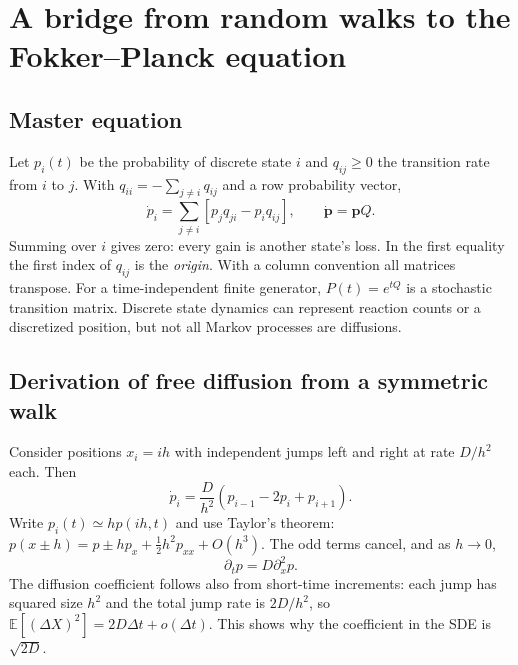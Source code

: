 \documentclass[11pt,a4paper]{article}
\newcommand{\E}{\mathbb E}
\theoremstyle{remark}\newtheorem*{remark}{Physical interpretation}
\begin{document}
\section{A bridge from random walks to the Fokker--Planck equation}
\subsection{Master equation}
Let $p_i(t)$ be the probability of discrete state $i$ and $q_{ij}\geq0$ the transition rate from $i$ to $j$. With $q_{ii}=-\sum_{j\ne i}q_{ij}$ and a row probability vector,
\begin{equation}\dot p_i=\sum_{j\ne i}[p_jq_{ji}-p_iq_{ij}],\qquad \dot{\mathbf p}=\mathbf p Q.\end{equation}
Summing over $i$ gives zero: every gain is another state's loss. In the first equality the first index of $q_{ij}$ is the \emph{origin}. With a column convention all matrices transpose. For a time-independent finite generator, $P(t)=e^{tQ}$ is a stochastic transition matrix. Discrete state dynamics can represent reaction counts or a discretized position, but not all Markov processes are diffusions.

\subsection{Derivation of free diffusion from a symmetric walk}
Consider positions $x_i=ih$ with independent jumps left and right at rate $D/h^2$ each. Then
\begin{equation}\dot p_i=\frac{D}{h^2}(p_{i-1}-2p_i+p_{i+1}).\end{equation}
Write $p_i(t)\simeq h p(ih,t)$ and use Taylor's theorem:
$p(x\pm h)=p\pm hp_x+\tfrac12h^2p_{xx}+O(h^3)$. The odd terms cancel, and as $h\to0$,
\begin{equation}\label{heat}\partial_t p=D\partial_x^2p.\end{equation}
The diffusion coefficient follows also from short-time increments: each jump has squared size $h^2$ and the total jump rate is $2D/h^2$, so $\E[(\Delta X)^2]=2D\Delta t+o(\Delta t)$. This shows why the coefficient in the SDE is $\sqrt{2D}$.
\end{document}
